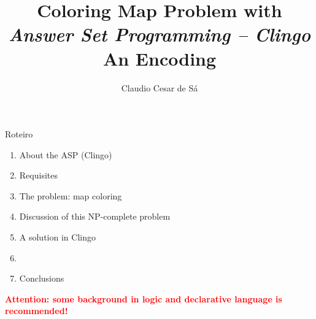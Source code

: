 \documentclass{beamer}
\title[Inteligência Artificial -- Otimização Combinatória] %
{Coloring Map Problem with \\ \textit{Answer Set Programming -- Clingo}\\ An Encoding}
\author[Claudio Cesar de Sá] %
{Claudio Cesar de Sá\inst{1}}
\institute[UDESC]{Independent Researcher}
\date[\today] %
\begin{document}
\begin{frame}
  \titlepage
\end{frame}








\begin{frame}

\begin{block}{Roteiro}

\begin{enumerate}

  \item  About the  ASP (Clingo)
  \item  Requisites
  \item  The problem: map coloring
  \item  Discussion of this NP-complete problem
  \item  A solution in Clingo
  \item  
  \item  Conclusions

  \end{enumerate}

\end{block}

\pause
\textbf{\textcolor{red}{Attention: some background in logic and declarative language is recommended!}}


\end{frame}
\end{document}

